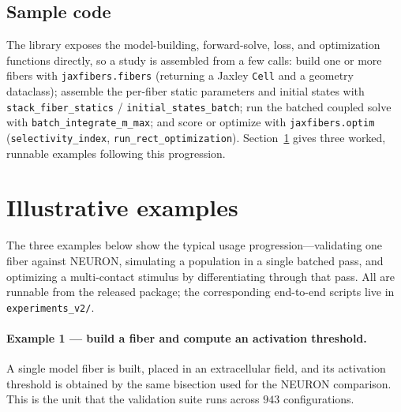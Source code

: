 \documentclass[preprint,12pt,a4paper]{elsarticle}
\begin{document}
\subsection{Sample code}

The library exposes the model-building, forward-solve, loss, and optimization functions
directly, so a study is assembled from a few calls: build one or more fibers with
\texttt{jaxfibers.fibers} (returning a Jaxley \texttt{Cell} and a geometry dataclass); assemble
the per-fiber static parameters and initial states with \texttt{stack\_fiber\_statics} /
\texttt{initial\_states\_batch}; run the batched coupled solve with \texttt{batch\_integrate\_m\_max};
and score or optimize with \texttt{jaxfibers.optim} (\texttt{selectivity\_index},
\texttt{run\_rect\_optimization}). Section~\ref{sec:examples} gives three worked, runnable
examples following this progression.

\section{Illustrative examples}
\label{sec:examples}

The three examples below show the typical usage progression---validating one fiber against
NEURON, simulating a population in a single batched pass, and optimizing a multi-contact stimulus
by differentiating through that pass. All are runnable from the released package; the
corresponding end-to-end scripts live in \texttt{experiments\_v2/}.

\paragraph{Example 1 --- build a fiber and compute an activation threshold.}
A single model fiber is built, placed in an extracellular field, and its activation threshold is
obtained by the same bisection used for the NEURON comparison. This is the unit that the
validation suite runs across $943$ configurations.
\end{document}
